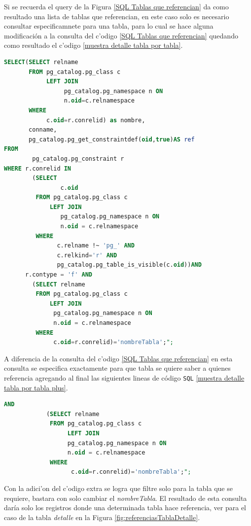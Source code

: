 Si se recuerda el query de la Figura \ref{SQL Tablas que referencian} da como resultado una lista de tablas que referencian, en este caso solo es necesario consultar especificamnete para una tabla, para lo cual se hace alguna modificaci\'on a la consulta del c'odigo \ref{SQL Tablas que referencian} quedando como  resultado el c'odigo \ref{muestra detalle tabla por tabla}.

\begin{lstlisting}[caption={Query para detalle referencias para una tabla},label={muestra detalle tabla por tabla},language=sql]
SELECT(SELECT relname
       FROM pg_catalog.pg_class c 
            LEFT JOIN 
                 pg_catalog.pg_namespace n ON 
                 n.oid=c.relnamespace
       WHERE
            c.oid=r.conrelid) as nombre,
       conname,
       pg_catalog.pg_get_constraintdef(oid,true)AS ref 
FROM
        pg_catalog.pg_constraint r 
WHERE r.conrelid IN
        (SELECT 
                c.oid 
         FROM pg_catalog.pg_class c 
             LEFT JOIN
                pg_catalog.pg_namespace n ON 
                n.oid = c.relnamespace 
         WHERE 
               c.relname !~ 'pg_' AND 
               c.relkind='r' AND 
               pg_catalog.pg_table_is_visible(c.oid))AND
      r.contype = 'f' AND 
        (SELECT relname 
         FROM pg_catalog.pg_class c 
             LEFT JOIN
              pg_catalog.pg_namespace n ON
              n.oid = c.relnamespace 
         WHERE
              c.oid=r.conrelid)='nombreTabla';";
\end{lstlisting}
A diferencia de la consulta del c'odigo \ref{SQL Tablas que referencian} en esta consulta se especifica exactamente para que tabla se quiere saber a quienes referencia agregando al final las siguientes lineas de c\'odigo \texttt{SQL} \ref{muestra detalle tabla por tabla plus}.

\begin{lstlisting}[caption={Parte que determina para una tabla},label={muestra detalle tabla por tabla plus},language=sql]
           AND 
            (SELECT relname 
             FROM pg_catalog.pg_class c 
                  LEFT JOIN
                  pg_catalog.pg_namespace n ON
                  n.oid = c.relnamespace 
             WHERE
                   c.oid=r.conrelid)='nombreTabla';";
\end{lstlisting}
Con la adici'on del c'odigo extra se logra que filtre solo para la tabla que se requiere, bastara con solo cambiar el \textit{nombreTabla}.
El resultado de esta consulta  dar\'ia solo los registros donde una determinada tabla hace referencia, ver para el caso de la tabla \textit{detalle} en la Figura \ref{fig:referenciasTablaDetalle}.


